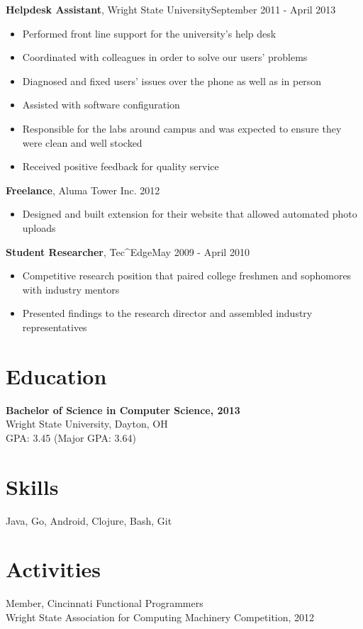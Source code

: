 \documentclass[line, margin, 10pt]{res} \setlength{\parskip}{9pt}
\begin{document}
\begin{resume}
  {\bf Helpdesk Assistant}, Wright State University\hfill September 2011 - April
  2013
  \begin{itemize} \itemsep -2pt %
  \item Performed front line support for the university's help desk
  \item Coordinated with colleagues in order to solve our users' problems
  \item Diagnosed and fixed users' issues over the phone as well as in person
  \item Assisted with software configuration
  \item Responsible for the labs around campus and was expected to ensure they
    were clean and well stocked
  \item Received positive feedback for quality service
  \end{itemize}

  {\bf Freelance}, Aluma Tower Inc. \hfill 2012
  \begin{itemize} \itemsep -2pt %
  \item Designed and built extension for their website that allowed automated
    photo uploads
  \end{itemize}

  {\bf Student Researcher}, Tec\^{}Edge\hfill May 2009 - April 2010
  \begin{itemize} \itemsep -2pt %
  \item Competitive research position that paired college freshmen and
    sophomores with industry mentors
  \item Presented findings to the research director and assembled
    industry representatives
  \end{itemize}


  \section{Education}
  {\bf Bachelor of Science in Computer Science, 2013}\\
  Wright State University, Dayton, OH\\
  GPA: 3.45 (Major GPA: 3.64)

\section{Skills}
Java, Go, Android, Clojure, Bash, Git

\section{Activities}
Member, Cincinnati Functional Programmers \\
Wright State Association for Computing Machinery Competition, 2012
  \\
\end{resume}
\end{document}
